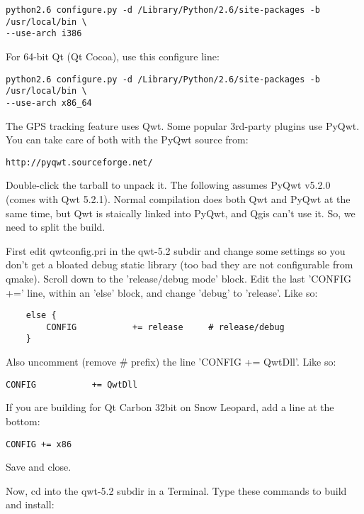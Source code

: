 \begin{verbatim}
python2.6 configure.py -d /Library/Python/2.6/site-packages -b /usr/local/bin \
--use-arch i386
\end{verbatim}

For 64-bit Qt (Qt Cocoa), use this configure line:

\begin{verbatim}
python2.6 configure.py -d /Library/Python/2.6/site-packages -b /usr/local/bin \
--use-arch x86_64
\end{verbatim}

The GPS tracking feature uses Qwt.  Some popular 3rd-party plugins use PyQwt.
You can take care of both with the PyQwt source from:

\begin{verbatim}
http://pyqwt.sourceforge.net/
\end{verbatim}

Double-click the tarball to unpack it.  The following assumes PyQwt v5.2.0 (comes with Qwt 5.2.1).
Normal compilation does both Qwt and PyQwt at the same time, but Qwt is staically linked
into PyQwt, and Qgis can't use it.  So, we need to split the build.

First edit qwtconfig.pri in the qwt-5.2 subdir and change some settings so
you don't get a bloated debug static library (too bad they are not configurable from
qmake).  Scroll down to the 'release/debug mode' block.  Edit the last 'CONFIG +='
line, within an 'else' block, and change 'debug' to 'release'.  Like so:

\begin{verbatim}
    else {
        CONFIG           += release     # release/debug
    }
\end{verbatim}

Also uncomment (remove \# prefix) the line 'CONFIG += QwtDll'.  Like so:

\begin{verbatim}
CONFIG           += QwtDll
\end{verbatim}

If you are building for Qt Carbon 32bit on Snow Leopard, add a line at the bottom:

\begin{verbatim}
CONFIG += x86
\end{verbatim}

Save and close.

Now, cd into the qwt-5.2 subdir in a Terminal.  Type these commands to build and install:

